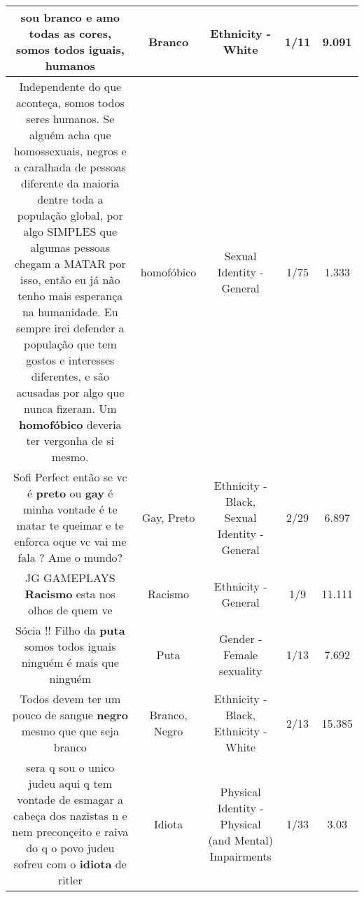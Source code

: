 \documentclass[11pt]{article}
\newlength\mylength
\begin{document}
\begin{center}
\begin{longtable}{|C{.65\mylength}|C{.30\mylength}|C{.12\mylength}|C{.12\mylength}|C{.12\mylength}|}
  \small sou \textbf{branco} e amo todas as cores, somos todos iguais, humanos\normalsize   & Branco & Ethnicity - White & 1/11 & 9.091 \\  \hline
  \small Independente do que aconteça, somos todos seres humanos. Se alguém acha que homossexuais, negros e a caralhada de pessoas diferente da maioria dentre toda a população global, por algo SIMPLES que algumas pessoas chegam a MATAR por isso, então eu já não tenho mais esperança na humanidade. Eu sempre irei defender a população que tem gostos e interesses diferentes, e são acusadas por algo que nunca fizeram. Um \textbf{homofóbico} deveria ter vergonha de si mesmo.\normalsize   & homofóbico & Sexual Identity - General & 1/75 & 1.333 \\  \hline
  \small Sofi Perfect então se vc é \textbf{preto} ou \textbf{gay} é minha vontade é te matar te queimar e te enforca oque vc vai me fala ? Ame o mundo?\normalsize   & Gay, Preto & Ethnicity - Black, Sexual Identity - General & 2/29 & 6.897 \\  \hline
  \small JG GAMEPLAYS \textbf{Racismo} esta nos olhos de quem ve\normalsize   & Racismo & Ethnicity - General & 1/9 & 11.111 \\  \hline
  \small Sócia !! Filho da \textbf{puta} somos todos iguais ninguém é mais que ninguém\normalsize   & Puta & Gender - Female sexuality & 1/13 & 7.692 \\  \hline
  \small Todos devem ter um pouco de sangue \textbf{negro} mesmo que que seja branco\normalsize   & Branco, Negro & Ethnicity - Black, Ethnicity - White & 2/13 & 15.385 \\  \hline
  \small sera q sou o unico judeu aqui q tem vontade de esmagar a cabeça dos nazistas        n e nem preconçeito e raiva do q o povo judeu sofreu com o \textbf{idiota} de ritler\normalsize   & Idiota & Physical Identity - Physical (and Mental) Impairments & 1/33 & 3.03 \\  \hline

\end{longtable}
\end{center}
\end{document}
